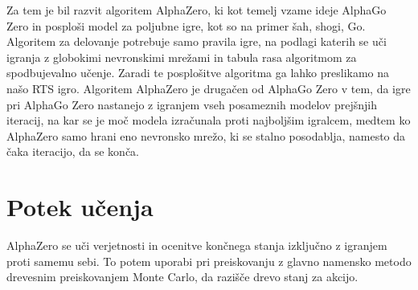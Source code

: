 \documentclass[a4paper, 12pt]{book}
\begin{document}
\noindent
Za tem je bil razvit algoritem AlphaZero, ki kot temelj vzame ideje AlphaGo Zero in posploši model za poljubne igre, kot so na primer šah, shogi, Go.
Algoritem za delovanje potrebuje samo pravila igre, na podlagi katerih se uči igranja z globokimi nevronskimi mrežami in tabula rasa algoritmom za spodbujevalno učenje.
Zaradi te posplošitve algoritma ga lahko preslikamo na našo RTS igro.
Algoritem AlphaZero je drugačen od AlphaGo Zero v tem, da igre pri AlphaGo Zero nastanejo z igranjem vseh posameznih modelov prejšnjih iteracij, na kar se je moč modela izračunala proti najboljšim igralcem, medtem ko AlphaZero samo hrani eno nevronsko mrežo, ki se stalno posodablja, namesto da čaka iteracijo, da se konča.

\section{Potek učenja}
\label{potekUcenja}
AlphaZero se uči verjetnosti in ocenitve končnega stanja izključno z igranjem proti samemu sebi. 
To potem uporabi pri preiskovanju z glavno namensko metodo drevesnim preiskovanjem Monte Carlo, da razišče drevo stanj za akcijo.
\end{document}
